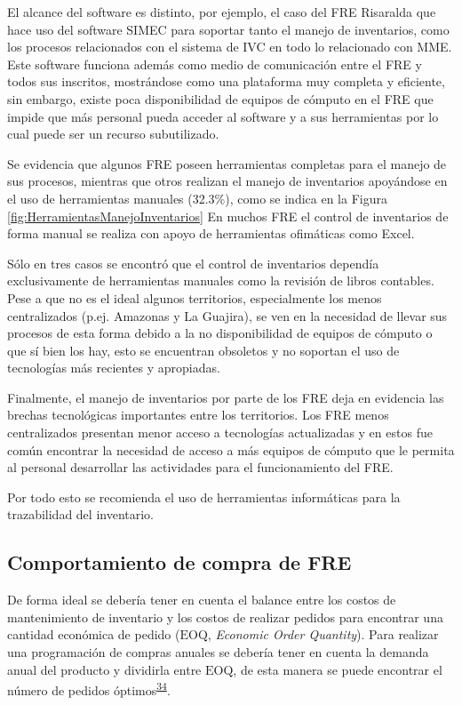 \documentclass[
  oneside]{book}
\begin{document}
El alcance del software es distinto, por ejemplo, el caso del FRE Risaralda que hace uso del software SIMEC para soportar tanto el manejo de inventarios, como los procesos relacionados con el sistema de IVC en todo lo relacionado con MME. Este software funciona además como medio de comunicación entre el FRE y todos sus inscritos, mostrándose como una plataforma muy completa y eficiente, sin embargo, existe poca disponibilidad de equipos de cómputo en el FRE que impide que más personal pueda acceder al software y a sus herramientas por lo cual puede ser un recurso subutilizado.

Se evidencia que algunos FRE poseen herramientas completas para el manejo de sus procesos, mientras que otros realizan el manejo de inventarios apoyándose en el uso de herramientas manuales (32.3\%), como se indica en la Figura \ref{fig:HerramientasManejoInventarios} En muchos FRE el control de inventarios de forma manual se realiza con apoyo de herramientas ofimáticas como Excel.

Sólo en tres casos se encontró que el control de inventarios dependía exclusivamente de herramientas manuales como la revisión de libros contables. Pese a que no es el ideal algunos territorios, especialmente los menos centralizados (p.ej. Amazonas y La Guajira), se ven en la necesidad de llevar sus procesos de esta forma debido a la no disponibilidad de equipos de cómputo o que sí bien los hay, esto se encuentran obsoletos y no soportan el uso de tecnologías más recientes y apropiadas.

Finalmente, el manejo de inventarios por parte de los FRE deja en evidencia las brechas tecnológicas importantes entre los territorios. Los FRE menos centralizados presentan menor acceso a tecnologías actualizadas y en estos fue común encontrar la necesidad de acceso a más equipos de cómputo que le permita al personal desarrollar las actividades para el funcionamiento del FRE.

Por todo esto se recomienda el uso de herramientas informáticas para la trazabilidad del inventario.

\hypertarget{comportamiento-de-compra-de-fre}{%
\subsection{Comportamiento de compra de FRE}\label{comportamiento-de-compra-de-fre}}

De forma ideal se debería tener en cuenta el balance entre los costos de mantenimiento de inventario y los costos de realizar pedidos para encontrar una cantidad económica de pedido (\(\mathrm{EOQ}\), \emph{Economic Order Quantity}). Para realizar una programación de compras anuales se debería tener en cuenta la demanda anual del producto y dividirla entre \(\mathrm{EOQ}\), de esta manera se puede encontrar el número de pedidos óptimos\textsuperscript{\protect\hyperlink{ref-Silver2017}{34}}.
\end{document}
